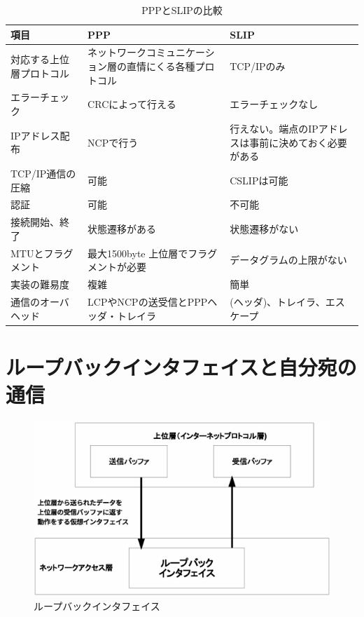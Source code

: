 \begin{table}[hbtp] \caption{PPPとSLIPの比較} \label{pppslip}
\begin{center}
	\begin{tabularx}{110mm}{lXX} \toprule
		項目 & PPP & SLIP \\ \midrule
		対応する上位層プロトコル & ネットワークコミュニケーション層の直情にくる各種プロトコル  & TCP/IPのみ \\
		エラーチェック & CRCによって行える & エラーチェックなし \\
		IPアドレス配布 & NCPで行う & 行えない。端点のIPアドレスは事前に決めておく必要がある \\
		TCP/IP通信の圧縮 & 可能 & CSLIPは可能 \\
		認証 & 可能 & 不可能 \\
		接続開始、終了 & 状態遷移がある & 状態遷移がない \\
		MTUとフラグメント & 最大1500byte 上位層でフラグメントが必要 & データグラムの上限がない \\
		実装の難易度 & 複雑 & 簡単 \\
		通信のオーバヘッド & LCPやNCPの送受信とPPPヘッダ・トレイラ & (ヘッダ)、トレイラ、エスケープ \\ \bottomrule
	\end{tabularx}
\end{center}
\end{table}

\section{ループバックインタフェイスと自分宛の通信}

\begin{figure}[htbp]
	\includegraphics[width=12cm,clip]{draw/loopback.eps}
	\caption{ループバックインタフェイス}
	\label{fig:loopback}
\end{figure}

